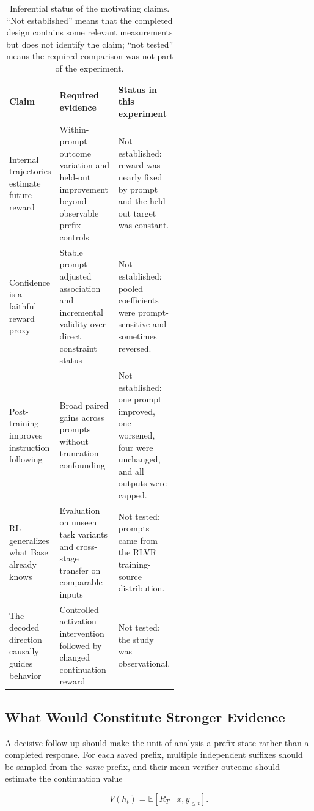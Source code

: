 \documentclass[manuscript,screen,nonacm]{acmart}
\begin{document}
\begin{table}[t]
\centering
\small
\caption{Inferential status of the motivating claims. ``Not established''
means that the completed design contains some relevant measurements but does
not identify the claim; ``not tested'' means the required comparison was not
part of the experiment.}
\label{tab:claim-audit}
\begin{tabularx}{\linewidth}{p{0.25\linewidth} X p{0.30\linewidth}}
\toprule
Claim & Required evidence & Status in this experiment \\
\midrule
Internal trajectories estimate future reward & Within-prompt outcome
variation and held-out improvement beyond observable prefix controls & Not
established: reward was nearly fixed by prompt and the held-out target was
constant. \\
Confidence is a faithful reward proxy & Stable prompt-adjusted association and
incremental validity over direct constraint status & Not established: pooled
coefficients were prompt-sensitive and sometimes reversed. \\
Post-training improves instruction following & Broad paired gains across
prompts without truncation confounding & Not established: one prompt improved,
one worsened, four were unchanged, and all outputs were capped. \\
RL generalizes what Base already knows & Evaluation on unseen task variants and
cross-stage transfer on comparable inputs & Not tested: prompts came from the
RLVR training-source distribution. \\
The decoded direction causally guides behavior & Controlled activation
intervention followed by changed continuation reward & Not tested: the study
was observational. \\
\bottomrule
\end{tabularx}
\end{table}

\subsection{What Would Constitute Stronger Evidence}

A decisive follow-up should make the unit of analysis a prefix state rather
than a completed response. For each saved prefix, multiple independent suffixes
should be sampled from the \emph{same} prefix, and their mean verifier outcome
should estimate the continuation value

\begin{equation}
V(h_t) = \mathbb{E}[R_T\mid x,y_{\leq t}].
\end{equation}
\end{document}
